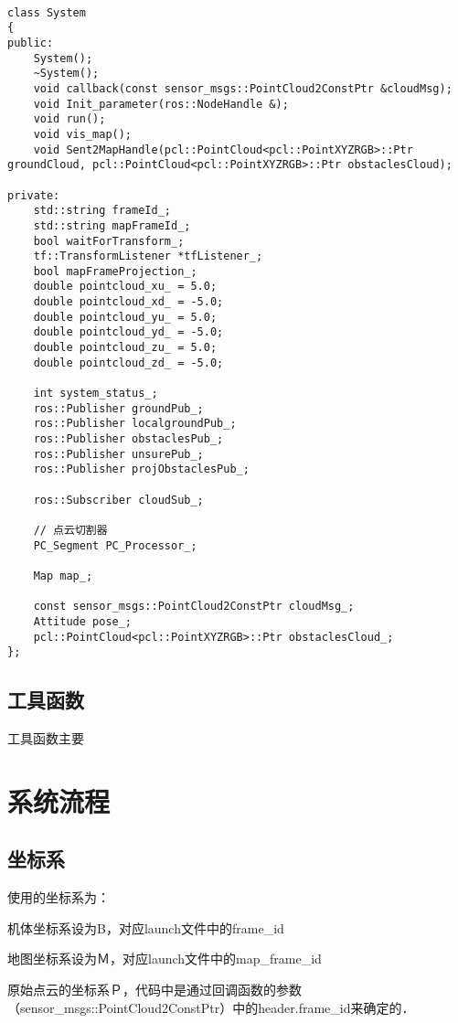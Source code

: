 \documentclass[UTF8]{ctexart}
\begin{document}
\begin{lstlisting}[caption={}]

class System
{
public:
	System();
	~System();
	void callback(const sensor_msgs::PointCloud2ConstPtr &cloudMsg);
	void Init_parameter(ros::NodeHandle &);
	void run();
	void vis_map();
	void Sent2MapHandle(pcl::PointCloud<pcl::PointXYZRGB>::Ptr groundCloud, pcl::PointCloud<pcl::PointXYZRGB>::Ptr obstaclesCloud);

private:
	std::string frameId_;
	std::string mapFrameId_;
	bool waitForTransform_;
	tf::TransformListener *tfListener_;
	bool mapFrameProjection_;
	double pointcloud_xu_ = 5.0;
	double pointcloud_xd_ = -5.0;
	double pointcloud_yu_ = 5.0;
	double pointcloud_yd_ = -5.0;
	double pointcloud_zu_ = 5.0;
	double pointcloud_zd_ = -5.0;

	int system_status_;
	ros::Publisher groundPub_;
	ros::Publisher localgroundPub_;
	ros::Publisher obstaclesPub_;
	ros::Publisher unsurePub_;
	ros::Publisher projObstaclesPub_;

	ros::Subscriber cloudSub_;

	// 点云切割器
	PC_Segment PC_Processor_;

	Map map_;

	const sensor_msgs::PointCloud2ConstPtr cloudMsg_;
	Attitude pose_;
	pcl::PointCloud<pcl::PointXYZRGB>::Ptr obstaclesCloud_;
};

\end{lstlisting}

\subsection{工具函数}

工具函数主要

\newpage

\section{系统流程}

\subsection{坐标系}

使用的坐标系为：

机体坐标系设为B，对应launch文件中的frame_id

地图坐标系设为Ｍ，对应launch文件中的map_frame_id

原始点云的坐标系Ｐ，代码中是通过回调函数的参数（sensor_msgs::PointCloud2ConstPtr）中的header.frame_id来确定的．
\end{document}
